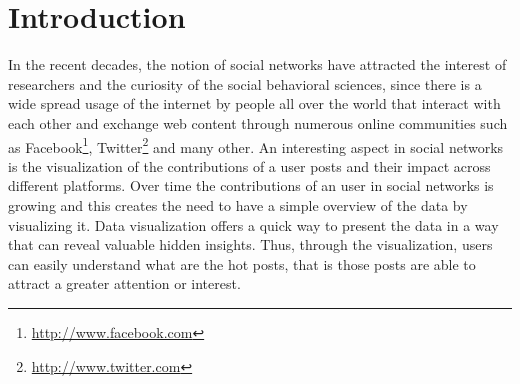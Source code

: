 \section{Introduction}


In the recent decades, the notion of social networks have attracted the interest of researchers and the curiosity of the social behavioral sciences, since there is a wide spread usage of the internet by people all over the world that interact with each other and exchange web content through numerous online communities such as Facebook\footnote{\url{http://www.facebook.com}}, Twitter\footnote{\url{http://www.twitter.com}} and many other.
An interesting aspect in social networks is the visualization of the contributions of a user posts and their impact across different platforms. Over time the contributions of an user in social networks is growing and this creates the need to have a simple overview of the data by visualizing it. Data visualization offers a quick way to present the data in a way that can reveal valuable hidden insights. Thus, through the visualization, users can easily understand what are the hot posts, that is those posts are able to attract a greater attention or interest.

